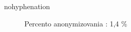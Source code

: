 \begin{hyphenrules}{nohyphenation}
\begin{figure}[H]
\begin{minipage}[t]{.4\linewidth}
\caption{Percento anonymizovania : 1,4 \%}
\label{fig:5.6} 
\end{minipage}\hfill
\begin{minipage}[b]{.4\linewidth}

\end{minipage}
\end{figure}
\end{hyphenrules}
